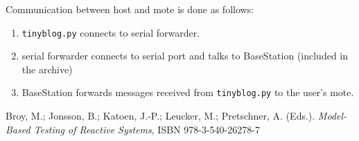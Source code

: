 \documentclass[english,11pt]{article}
\numberwithin{equation}{section}
\begin{document}
Communication between host and mote is done as follows:
\begin{enumerate}
    \item \texttt{tinyblog.py} connects to serial forwarder.
    \item serial forwarder connects to serial port and talks to BaseStation
        (included in the archive)
    \item BaseStation forwards messages received from \texttt{tinyblog.py} to
        the user's mote.
\end{enumerate}

\begin{thebibliography}{9}

        Broy, M.; Jonsson, B.; Katoen, J.-P.; Leucker, M.; Pretschner, A.
        (Eds.). \emph{Model-Based Testing of Reactive Systems}, ISBN
        978-3-540-26278-7

\end{thebibliography}
\end{document}

